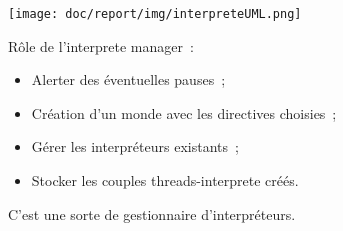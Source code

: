 
\begin{frame}
\texttt{[image: doc/report/img/interpreteUML.png]}
\end{frame}

\begin{frame}
Rôle de l'interprete manager~:
\begin{itemize}
	\item Alerter des éventuelles pauses~;
	\item Création d'un monde avec les directives choisies~;
	\item Gérer les interpréteurs existants~;
	\item Stocker les couples threads-interprete créés.
\end{itemize}
C'est une sorte de gestionnaire d'interpréteurs.
\end{frame}

\begin{frame}
\end{frame}
